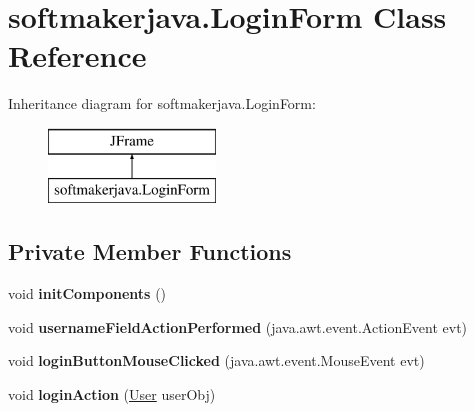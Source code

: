 \hypertarget{classsoftmakerjava_1_1_login_form}{}\section{softmakerjava.\+Login\+Form Class Reference}
\label{classsoftmakerjava_1_1_login_form}
Inheritance diagram for softmakerjava.\+Login\+Form\+:\begin{figure}[H]
\begin{center}
\leavevmode
\includegraphics[height=2.000000cm]{classsoftmakerjava_1_1_login_form}
\end{center}
\end{figure}
\subsection*{Private Member Functions}
\begin{DoxyCompactItemize}
\item 
void {\bfseries init\+Components} ()\hypertarget{classsoftmakerjava_1_1_login_form_aa525caaa4005a23182f277fa7969968d}{}\label{classsoftmakerjava_1_1_login_form_aa525caaa4005a23182f277fa7969968d}

\item 
void {\bfseries username\+Field\+Action\+Performed} (java.\+awt.\+event.\+Action\+Event evt)\hypertarget{classsoftmakerjava_1_1_login_form_a4c5c894c2161d64ba97f7294ad16b4ea}{}\label{classsoftmakerjava_1_1_login_form_a4c5c894c2161d64ba97f7294ad16b4ea}

\item 
void {\bfseries login\+Button\+Mouse\+Clicked} (java.\+awt.\+event.\+Mouse\+Event evt)\hypertarget{classsoftmakerjava_1_1_login_form_a3ca2528a35be8b1e4f665481da171fe8}{}\label{classsoftmakerjava_1_1_login_form_a3ca2528a35be8b1e4f665481da171fe8}

\item 
void {\bfseries login\+Action} (\hyperlink{classsoftmakerjava_1_1_user}{User} user\+Obj)\hypertarget{classsoftmakerjava_1_1_login_form_ac469ebbf9a6341fc4bb7825c6b1b51a1}{}\label{classsoftmakerjava_1_1_login_form_ac469ebbf9a6341fc4bb7825c6b1b51a1}

\end{DoxyCompactItemize}
